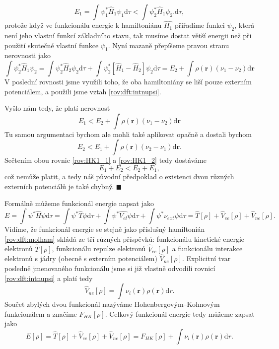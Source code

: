 \begin{equation}
E_1 = \int \psi_1^* \hat{H}_1 \psi_1 \mathrm{d}\tau < \int \psi_2^* \hat{H}_1 \psi_2 . \mathrm{d}\tau ,
\end{equation}
protože když ve funkcionálu energie k hamiltoniánu $\hat{H_1}$ přiřadíme funkci $\psi_2$, která není jeho vlastní funkcí základního stavu, tak musíme dostat větší energii než při použití skutečné vlastní funkce $\psi_1$. Nyní mazaně přepíšeme pravou stranu nerovnosti jako  
\begin{equation}
\int \psi_2^* \hat{H}_1 \psi_2 = \int \psi_2^* \hat{H}_2 \psi_2\mathrm{d}\tau  + \int \psi_2^* \left[\hat{H}_1-\hat{H}_2\right] \psi_2\mathrm{d}\tau = E_2 + \int \rho(\mathbf{r})(\nu_1-\nu_2)\mathrm{d}\mathbf{r}  
\end{equation}
V poslední rovnosti jsme využili toho, že oba hamiltoniány se liší pouze externím potenciálem, a použili jsme vztah \eqref{rov:dft:intnupsi}.

\noindent Vyšlo nám tedy, že platí nerovnost
\begin{equation}
E_1 < E_2+\int \rho(\mathbf{r})(\nu_1-\nu_2)\mathrm{d}\mathbf{r}
\label{rov:HK1_1}
\end{equation}
Tu samou argumentaci bychom ale mohli také aplikovat opačně a dostali bychom
\begin{equation}
E_2 < E_1+\int \rho(\mathbf{r})(\nu_2-\nu_1)\mathrm{d}\mathbf{r} .
\label{rov:HK1_2}
\end{equation}
Sečtením obou rovnic \eqref{rov:HK1_1} a \eqref{rov:HK1_2} tedy dostáváme
\begin{equation}
E_1 + E_2 < E_2 + E_1 ,
\end{equation}
což nemůže platit, a tedy náš původní předpoklad o existenci dvou různých externích potenciálů je také chybný.
\hfill {\footnotesize $\blacksquare$}

Formálně můžeme funkcionál energie napsat jako
\begin{equation}
E=\int \psi^*\hat{H}\psi \mathrm{d}\tau = \int \psi^*\hat{T}\psi\mathrm{d}\tau + \int \psi^*\hat{V_{el}}\psi\mathrm{d}\tau + \int \psi^*\nu_{ext}\psi\mathrm{d}\tau=\hat{T}[\rho]+\hat{V}_{ee}[\rho]+\hat{V}_{ne}[\rho] .
\end{equation}
Vidíme, že funkcionál energie se stejně jako příslušný hamiltonián \eqref{rov:dft:molham} skládá ze tří různých příspěvků: funkcionálu kinetické energie elektronů $\hat{T}[\rho]$, funkcionálu repulze elektronů $\hat{V}_{ee}[\rho]$ a funkcionálu interakce elektronů s jádry (obecně s externím potenciálem) $\hat{V}_{ne}[\rho]$. 
Explicitní tvar posledně jmenovaného funkcionálu jsme si již vlastně odvodili rovnicí \eqref{rov:dft:intnupsi} a platí tedy
\begin{equation}
\hat{V}_{ne}[\rho] = \int \nu_i(\textbf{r})\rho(\textbf{r}) \mathrm{d}r .
\end{equation}
Součet zbylých dvou funkcionál nazýváme Hohenbergovým--Kohnovým funkcionálem a značíme $F_{HK}[\rho]$. 
Celkový funkcionál energie tedy můžeme zapsat jako
\begin{equation}
E[\rho] = \hat{T}[\rho]+\hat{V}_{ee}[\rho]+\hat{V}_{ne}[\rho] = F_{HK}[\rho] + \int \nu_i(\textbf{r})\rho(\textbf{r}) \mathrm{d}r .
\end{equation}

